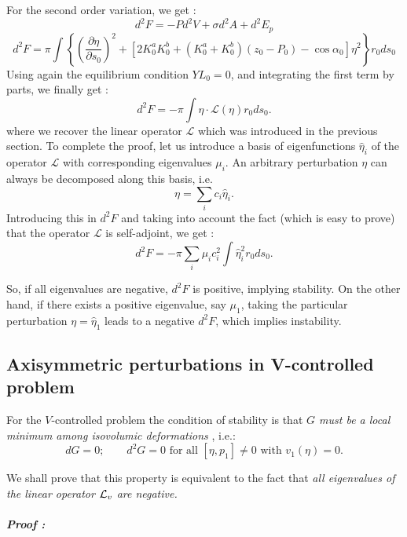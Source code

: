 \documentclass{jfm}
\newcommand\be{\begin{equation}}
\newcommand\ee{\end{equation}}
\newcommand\DP[2]{\frac{\partial #1}{\partial #2}}
\begin{document}
For the second order variation, we get :
\be
d^2 F = - P d^2 V + \sigma d^2 A + d^2  E_p
\ee
\be
d^2 F = \pi \int 
\left\{ \left( \DP{\eta}{s_0}\right)^2 
+ \left[ 2 K_0^a K_0^b + (K_0^a + K_0^b)(z_0 - P_0) - \cos \alpha_0 \right] \eta^2  
\right\} r_0 d s_0
\ee
Using again the equilibrium condition $YL_0=0$, and integrating the first term by parts, we finally get :
\be
d^2 F = - \pi \int \eta \cdot {\mathcal L} (\eta) r_0 d s_0.
\label{eq:d2G}
\ee
where we recover the linear operator ${\mathcal L}$ which was introduced in the previous section.
To complete the proof, let us introduce a basis of eigenfunctions $\hat \eta_i$ of the operator ${\mathcal L}$ with corresponding eigenvalues $\mu_i$. 
An arbitrary perturbation $\eta$ can always be decomposed along this basis, i.e. 
\be 
\eta = \sum_i c_i \hat{\eta}_i.
\ee
Introducing this in $d^2 F$ and taking into account the fact (which is easy to prove) that the operator $\mathcal L$ is self-adjoint, we get : 
\be
d^2 F = - \pi \sum_i  \mu_i c_i ^2 \int \hat{\eta}_i^2  r_0 d s_0.
\ee

So, if all eigenvalues are negative, $d^2 F$ is positive, implying stability. On the other hand, if there exists a positive eigenvalue, say $\mu_1$,  taking the particular perturbation $\eta = \hat{\eta}_1$  leads to a negative $d^2 F$, which implies instability.
 
\subsection{Axisymmetric perturbations in V-controlled problem} 




For the $V$-controlled problem the condition of stability is that {\em $G$ must be a local minimum among isovolumic deformations }, i.e.:
\be
dG = 0 ; \qquad d^2 G = 0 \mbox{ for all } [\eta,p_1] \ne 0 \mbox{ with } v_1(\eta) = 0. 
\ee 

We shall prove that this property is equivalent to the fact that {\em all eigenvalues of the linear operator ${\cal L}_v$ are negative.}

\paragraph{\em Proof :}
\end{document}
